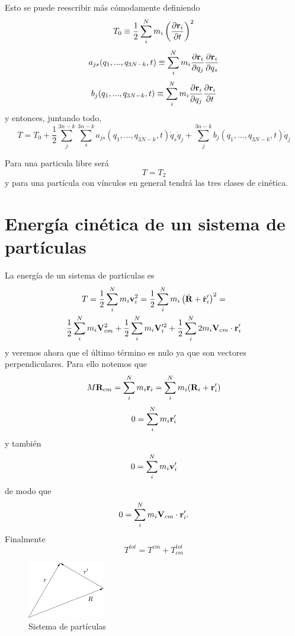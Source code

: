 \documentclass[10pt,oneside]{CBFT_article}
\begin{document}
Esto se puede reescribir más cómodamente definiendo
\[
T_0 \equiv \frac{1}{2} \sum_i^N m_i \left( \dpar{\vb{r}_i}{t} \right)^2
\]
\[
a_{js}(q_1,...,q_{3N-k},t) \equiv \sum_i^N  m_i \dpar{\vb{r}_i}{q_j}\dpar{\vb{r}_i}{q_s}
\]
\[
b_j(q_1,...,q_{3N-k},t) \equiv \sum_i^N  m_i \dpar{\vb{r}_i}{q_j}\dpar{\vb{r}_i}{t}
\]
y entonces, juntando todo,
\[
T = T_0 +
\frac{1}{2} \sum_j^{3n-k}\sum_s^{3n-k}  a_{js}(q_1,...,q_{3N-k},t)\dot{q}_s\dot{q}_j  + 
\sum_j^{3n-k} b_j(q_1,...,q_{3N-k},t)\dot{q}_j  
\]

Para una particula libre será
\[
T = T_2
\]
y para una partícula con vínculos en general tendrá las tres clases de cinética.

\section{Energía cinética de un sistema de partículas}

La energía de un sistema de partículas es 
\begin{multline*}
T = \frac{1}{2} \sum_i^N m_i \vb{v}_i^2 = 
\frac{1}{2} \sum_i^N m_i \left( \dot{\vb{R}} + \dot{\vb{r}}_i' \right)^2 = \\
\frac{1}{2} \sum_i^N m_i \vb{V}_{cm}^2  +
\frac{1}{2} \sum_i^N m_i \vb{V}_i'^2 +
\frac{1}{2} \sum_i^N 2 m_i \vb{V}_{cm} \cdot  \vb{r}_{i}' 
\end{multline*}
y veremos ahora que el último término es nulo ya que son vectores perpendiculares.
Para ello notemos que 
\[
M \vb{R}_{cm} = \sum_i^N m_i \vb{r}_i = \sum_i^N m_i ( \vb{R}_i + \vb{r}_i' )
\]
\[
0 = \sum_i^N m_i \vb{r}_i'
\]
y también 
\[
0 = \sum_i^N m_i \vb{v}_i'
\]
de modo que 
\[
0 = \sum_i^N m_i \vb{V}_{cm} \cdot \vb{r}_i'.
\]
Finalmente 
\[
T^{tot} = T^{cm} + T_{cm}^{tot}
\]

\begin{figure}
	\begin{center}
	\includegraphics[width=0.3\textwidth]{images/fig_sist_part.pdf}	 
	\end{center}
	\caption{Sistema de partículas}
\end{figure} 
\end{document}

